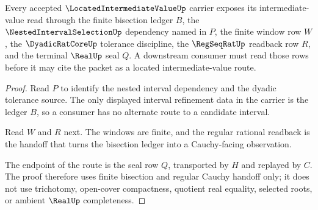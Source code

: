 \begin{theorem}
\label{thm:located-intermediate-value-nested-interval-route}
Every accepted $\LocatedIntermediateValueUp$ carrier exposes its intermediate-value read through the finite bisection ledger $B$, the $\NestedIntervalSelectionUp$ dependency named in $P$, the finite window row $W$, the $\DyadicRatCoreUp$ tolerance discipline, the $\RegSeqRatUp$ readback row $R$, and the terminal $\RealUp$ seal $Q$. A downstream consumer must read those rows before it may cite the packet as a located intermediate-value route.
\end{theorem}
\begin{proof}
Read $P$ to identify the nested interval dependency and the dyadic tolerance source. The only displayed interval refinement data in the carrier is the ledger $B$, so a consumer has no alternate route to a candidate interval.

Read $W$ and $R$ next. The windows are finite, and the regular rational readback is the handoff that turns the bisection ledger into a Cauchy-facing observation.

The endpoint of the route is the seal row $Q$, transported by $H$ and replayed by $C$. The proof therefore uses finite bisection and regular Cauchy handoff only; it does not use trichotomy, open-cover compactness, quotient real equality, selected roots, or ambient $\RealUp$ completeness.
\end{proof}


\begin{closurestatus}{\LocatedIntermediateValueUp}
  \theoryclosure{\seedClosure}
  \formalstatus{\unformalizedV}
\end{closurestatus}
